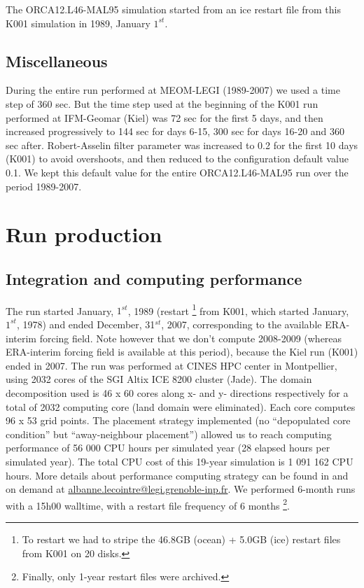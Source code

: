 \documentclass[12pt]{article}
\begin{document}
\scriptsize


\normalsize

The ORCA12.L46-MAL95 simulation started from an ice restart file from this K001 simulation in 1989, January $1^{st}$.

\subsection{Miscellaneous}

During the entire run performed at MEOM-LEGI (1989-2007) we used a time step of 360 sec. But the time step used at the beginning of the K001 run performed at IFM-Geomar (Kiel) was 72 sec for the first 5 days, and then increased progressively to 144 sec for days 6-15, 300 sec for days 16-20 and 360 sec after. Robert-Asselin filter parameter was increased to 0.2 for the first 10 days (K001) to avoid overshoots, and then reduced to the configuration default value 0.1. We kept this default value for the entire ORCA12.L46-MAL95 run over the period 1989-2007.


\section{Run production}

\subsection{Integration and computing performance}

The run started January, $1^{st}$, 1989 (restart \footnote{To restart we had to stripe the 46.8GB (ocean) + 5.0GB (ice) restart files from K001 on 20 disks.} from K001, which started January, $1^{st}$, 1978) and ended December, 31$^{st}$, 2007, corresponding to the available ERA-interim forcing field. Note however that we don't compute 2008-2009 (whereas ERA-interim forcing field is available at this period), because the Kiel run (K001) ended in 2007. The run was performed at CINES HPC center in Montpellier, using 2032 cores of the SGI Altix ICE 8200 cluster (Jade). The domain decomposition used is 46 x 60 cores along x- and y- directions respectively for a total of 2032 computing core (land domain were eliminated). Each core computes 96 x 53 grid points. The placement strategy implemented (no ``depopulated core condition'' but ``away-neighbour placement'') allowed us to reach computing performance of 56 000 CPU hours per simulated year (28 elapsed hours per simulated year). The total CPU cost of this 19-year simulation is 1 091 162 CPU hours. More details about performance computing strategy can be found in \cite{Lecointre2011} and on demand at \href{mailto:albanne.lecointre@legi.grenoble-inp.fr}{albanne.lecointre@legi.grenoble-inp.fr}. We performed 6-month runs with a 15h00 walltime, with a restart file frequency of 6 months \footnote{Finally, only 1-year restart files were archived.}.
\end{document}
